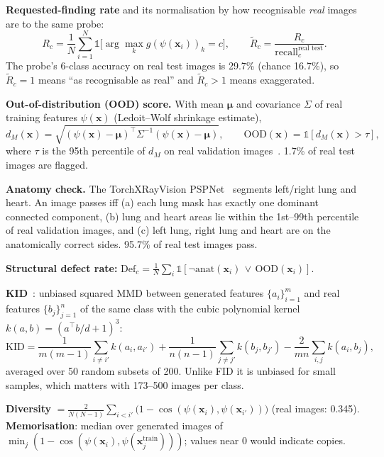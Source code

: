 \documentclass[twoside,english]{article}
\newcommand{\x}{\mathbf{x}}
\begin{document}
\textbf{Requested-finding rate} and its normalisation by how recognisable \emph{real} images are to the same probe:
\begin{equation}
R_c=\frac1N\sum_{i=1}^N\mathbb 1\big[\arg\max_k g(\psi(\x_i))_k=c\big],\qquad
\tilde R_c=\frac{R_c}{\text{recall}_c^{\text{real test}}}.
\end{equation}
The probe's 6-class accuracy on real test images is 29.7\% (chance 16.7\%), so $\tilde R_c=1$ means ``as recognisable as real'' and $\tilde R_c>1$ means exaggerated.

\textbf{Out-of-distribution (OOD) score.} With mean $\boldsymbol\mu$ and covariance $\Sigma$ of real training features $\psi(\x)$ (Ledoit--Wolf shrinkage estimate),
\begin{equation}
d_M(\x)=\sqrt{(\psi(\x)-\boldsymbol\mu)^\top\Sigma^{-1}(\psi(\x)-\boldsymbol\mu)},\qquad \text{OOD}(\x)=\mathbb 1[d_M(\x)>\tau],
\end{equation}
where $\tau$ is the 95th percentile of $d_M$ on real validation images~\citep{lee2018mahalanobis}. 1.7\% of real test images are flagged.

\textbf{Anatomy check.} The TorchXRayVision PSPNet~\citep{zhao2017pspnet} segments left/right lung and heart. An image passes iff (a) each lung mask has exactly one dominant connected component, (b) lung and heart areas lie within the 1st--99th percentile of real validation images, and (c) left lung, right lung and heart are on the anatomically correct sides. 95.7\% of real test images pass.

\textbf{Structural defect rate:} $\text{Def}_c=\frac1N\sum_i \mathbb 1[\neg\text{anat}(\x_i)\,\vee\,\text{OOD}(\x_i)]$.

\textbf{KID}~\citep{binkowski2018kid}: unbiased squared MMD between generated features $\{a_i\}_{i=1}^m$ and real features $\{b_j\}_{j=1}^n$ of the same class with the cubic polynomial kernel $k(a,b)=(a^\top b/d+1)^3$:
\begin{equation}
\text{KID}=\frac{1}{m(m-1)}\sum_{i\neq i'}k(a_i,a_{i'})+\frac{1}{n(n-1)}\sum_{j\neq j'}k(b_j,b_{j'})-\frac{2}{mn}\sum_{i,j}k(a_i,b_j),
\end{equation}
averaged over 50 random subsets of 200. Unlike FID it is unbiased for small samples, which matters with 173--500 images per class.

\textbf{Diversity} $=\frac{2}{N(N-1)}\sum_{i<i'}\big(1-\cos(\psi(\x_i),\psi(\x_{i'}))\big)$ (real images: 0.345). \textbf{Memorisation}: median over generated images of $\min_j(1-\cos(\psi(\x_i),\psi(\x_j^{\text{train}})))$; values near 0 would indicate copies.
\end{document}
